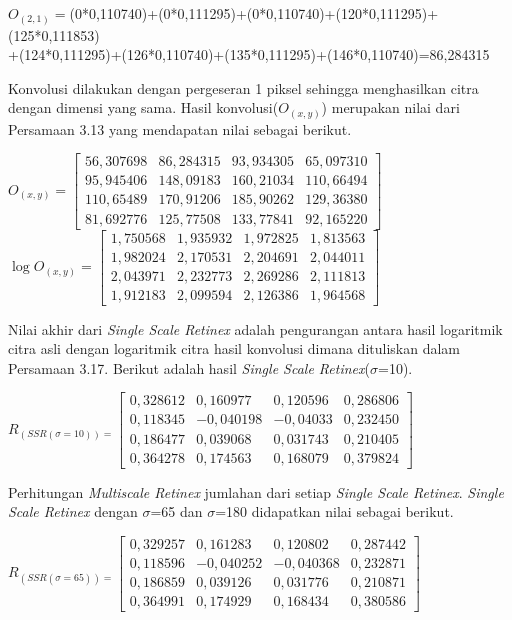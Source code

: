 \noindent$O_{(2,1)}=$(0*0,110740)+(0*0,111295)+(0*0,110740)+(120*0,111295)+(125*0,111853)\\
+(124*0,111295)+(126*0,110740)+(135*0,111295)+(146*0,110740)=86,284315

\noindent Konvolusi dilakukan dengan pergeseran 1 piksel sehingga menghasilkan citra dengan dimensi yang sama. Hasil konvolusi($O_{(x,y)}$) merupakan nilai dari Persamaan 3.13 yang mendapatan nilai sebagai berikut.

\noindent
$O_{(x,y)}=\left[
\begin{matrix}
56,307698&	86,284315&	93,934305&	65,097310\\
95,945406&	148,09183&	160,21034&	110,66494\\
110,65489&	170,91206&	185,90262&	129,36380\\
81,692776&	125,77508&	133,77841&	92,165220
\end{matrix}
\right]$\\
$\log O_{(x,y)}=\left[
\begin{matrix}
1,750568&	1,935932&	1,972825&	1,813563\\
1,982024&	2,170531&	2,204691&	2,044011\\
2,043971&	2,232773&	2,269286&	2,111813\\
1,912183&	2,099594&	2,126386&	1,964568

\end{matrix}
\right]$

\noindent Nilai akhir dari \emph{Single Scale Retinex} adalah pengurangan antara hasil logaritmik citra asli dengan logaritmik citra hasil konvolusi dimana dituliskan dalam Persamaan 3.17. Berikut adalah hasil \emph{Single Scale Retinex}($\sigma$=10).

\noindent
$R_{(SSR(\sigma=10))=}\left[
\begin{matrix}
0,328612&	0,160977&	0,120596&	0,286806\\
0,118345&	-0,040198&	-0,04033&	0,232450\\
0,186477&	0,039068&	0,031743&	0,210405\\
0,364278&	0,174563&	0,168079&	0,379824
\end{matrix}
\right]$

\noindent Perhitungan \emph{Multiscale Retinex} jumlahan dari setiap \emph{Single Scale Retinex}. \emph{Single Scale Retinex} dengan $\sigma$=65 dan $\sigma$=180 didapatkan nilai sebagai berikut.

\noindent
$R_{(SSR(\sigma=65))=}\left[
\begin{matrix}
0,329257&	0,161283&	0,120802&	0,287442\\
0,118596&	-0,040252&	-0,040368&	0,232871\\
0,186859&	0,039126&	0,031776&	0,210871\\
0,364991&	0,174929&	0,168434&	0,380586
\end{matrix}
\right]$

